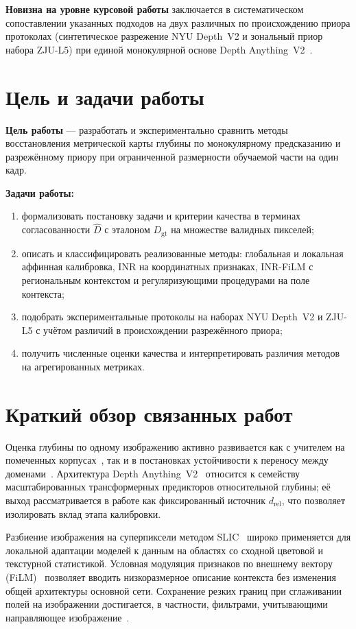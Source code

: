 \documentclass[12pt]{article}
\begin{document}
\textbf{Новизна на уровне курсовой работы} заключается в систематическом сопоставлении указанных подходов на двух различных по происхождению приора протоколах (синтетическое разрежение NYU Depth~V2 и зональный приор набора ZJU-L5) при единой монокулярной основе Depth Anything~V2~\cite{yang2024depthanythingv2}.

\section{Цель и задачи работы}

\textbf{Цель работы} --- разработать и экспериментально сравнить методы восстановления метрической карты глубины по монокулярному предсказанию и разрежённому приору при ограниченной размерности обучаемой части на один кадр.

\textbf{Задачи работы:}
\begin{enumerate}
  \item формализовать постановку задачи и критерии качества в терминах согласованности $\hat D$ с эталоном $D_{\mathrm{gt}}$ на множестве валидных пикселей;
  \item описать и классифицировать реализованные методы: глобальная и локальная аффинная калибровка, INR на координатных признаках, INR-FiLM с региональным контекстом и регуляризующими процедурами на поле контекста;
  \item подобрать экспериментальные протоколы на наборах NYU Depth~V2 и ZJU-L5 с учётом различий в происхождении разрежённого приора;
  \item получить численные оценки качества и интерпретировать различия методов на агрегированных метриках.
\end{enumerate}

\section{Краткий обзор связанных работ}

Оценка глубины по одному изображению активно развивается как с учителем на помеченных корпусах~\cite{eigen2014depth}, так и в постановках устойчивости к переносу между доменами~\cite{ranftl2020robust}. Архитектура Depth Anything~V2~\cite{yang2024depthanythingv2} относится к семейству масштабированных трансформерных предикторов относительной глубины; её выход рассматривается в работе как фиксированный источник $d_{\mathrm{rel}}$, что позволяет изолировать вклад этапа калибровки.

Разбиение изображения на суперпиксели методом SLIC~\cite{achanta2012slic} широко применяется для локальной адаптации моделей к данным на областях со сходной цветовой и текстурной статистикой. Условная модуляция признаков по внешнему вектору (FiLM)~\cite{perez2018film} позволяет вводить низкоразмерное описание контекста без изменения общей архитектуры основной сети. Сохранение резких границ при сглаживании полей на изображении достигается, в частности, фильтрами, учитывающими направляющее изображение~\cite{he2010guided}.
\end{document}
